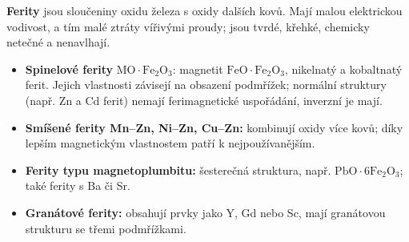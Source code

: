 \textbf{Ferity} jsou sloučeniny oxidu železa s oxidy dalších kovů. Mají malou elektrickou vodivost, a tím malé ztráty vířivými proudy; jsou tvrdé, křehké, chemicky netečné a nenavlhají.
\begin{itemize}
\item \textbf{Spinelové ferity} $\mathrm{MO\cdot Fe_2O_3}$: magnetit $\mathrm{FeO\cdot Fe_2O_3}$, nikelnatý a kobaltnatý ferit. Jejich vlastnosti závisejí na obsazení podmřížek; normální struktury (např. Zn a Cd ferit) nemají ferimagnetické uspořádání, inverzní je mají.
\item \textbf{Smíšené ferity Mn--Zn, Ni--Zn, Cu--Zn:} kombinují oxidy více kovů; díky lepším magnetickým vlastnostem patří k nejpoužívanějším.
\item \textbf{Ferity typu magnetoplumbitu:} šesterečná struktura, např. $\mathrm{PbO\cdot6Fe_2O_3}$; také ferity s Ba či Sr.
\item \textbf{Granátové ferity:} obsahují prvky jako Y, Gd nebo Sc, mají granátovou strukturu se třemi podmřížkami.
\end{itemize}
